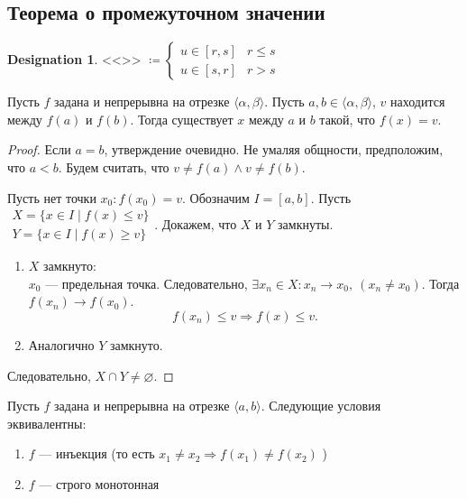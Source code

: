 \documentclass[11pt]{book}
\renewcommand{\le}{\leqslant}
\renewcommand{\ge}{\geqslant}
\theoremstyle{definition}
\theoremstyle{plain}
\theoremstyle{plain}
\theoremstyle{definition}
\newtheorem*{name}{Designation}
\theoremstyle{remark}
\begin{document}
\subsection{Теорема о промежуточном значении}
\begin{name}
    <<>> $\coloneqq  
     \begin{cases}
	 u \in [r, s] &  r \le s \\
	 u \in [s, r] & r > s
    \end{cases}
    $
\end{name}
\begin{thm}
    Пусть $ f$ задана и непрерывна на отрезке  $ \langle \alpha , \beta \rangle$.  Пусть $ a, b \in  \langle \alpha , \beta  \rangle$, $ v$ находится между $ f(a) $ и $ f(b)$. Тогда существует $ x$ между  $ a$ и  $ b$ такой, что  $ f(x) = v$.
\end{thm}
\begin{proof}
    Если $ a = b$, утверждение очевидно.
    Не умаляя общности, предположим, что  $ a < b$. Будем считать, что  $ v \ne f(a) \wedge v \ne f(b)$. 
    
    Пусть нет точки  $ x_0: f(x_0) = v$.
    Обозначим $ I = [a, b]$.
    Пусть $
    \begin{array}{l}
	X = \{x \in I\mid f(x) \le v\}\\
	Y = \{x \in I\mid f(x) \ge  v\}
    \end{array}
    $. %
    Докажем, что $ X$ и  $ Y$ замкнуты.
    \begin{enumerate}
        \item $ X$ замкнуто:\\
	    $ x_0$ --- предельная точка. Следовательно, $ \exists x_{n} \in X: x_{n} \to  x_0, ~ (x_{n} \ne  x_0)$.
	    Тогда $ f(x_{n}) \to  f(x_0)$. 
	     \[
		 f(x_{n}) \le  v \Longrightarrow f(x) \le  v
	    .\] 
	\item Аналогично  $ Y$ замкнуто.
    \end{enumerate}
    Следовательно,  $ X \cap Y \ne \varnothing$.
\end{proof}
\begin{thm}
    Пусть $ f$ задана и непрерывна на отрезке $ \langle a, b \rangle$. Следующие условия эквивалентны:
    \begin{enumerate}
	\item $ f$ --- инъекция (то есть  $ x_1 \ne x_2 \Longrightarrow f(x_1) \ne f(x_2)$ )
	\item $ f$ --- строго монотонная
    \end{enumerate}
\end{thm}
\end{document}
